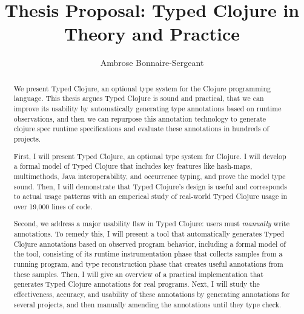 \documentclass[9pt]{extarticle}
\title{Thesis Proposal: Typed Clojure in Theory and Practice}
\author{Ambrose Bonnaire-Sergeant}
\begin{document}
\maketitle

\begin{abstract}
We present Typed Clojure, an optional type system for the Clojure programming language.
This thesis argues Typed Clojure is sound and practical,
that we can improve its usability by automatically generating type annotations based on runtime observations,
and then we can repurpose this annotation technology to generate clojure.spec runtime specifications
and evaluate these annotations in hundreds of projects.

First, I will present Typed Clojure, an optional type system for Clojure.
I will develop a formal model of Typed Clojure that includes
key features like hash-maps, multimethods, Java interoperability, and occurrence typing,
and prove the model type sound.
Then, I will demonstrate that Typed Clojure's design is useful and corresponds to actual usage patterns
with an emperical study of real-world Typed Clojure usage in over 19,000 lines of code.

Second, we address a major usability flaw in Typed Clojure: users must \emph{manually}
write annotations.
To remedy this, 
I will present a tool that automatically generates Typed Clojure annotations based on observed
program behavior, including
a formal model of the tool, consisting of its runtime instrumentation phase that
collects samples from a running program, and type reconstruction phase
that creates useful annotations from these samples.
Then, I will give an overview of a practical implementation that generates Typed Clojure annotations for
real programs.
Next, I will study the effectiveness, accuracy, and usability of these annotations
by generating annotations for several projects, and then manually amending the annotations
until they type check.


\end{abstract}
\end{document}

